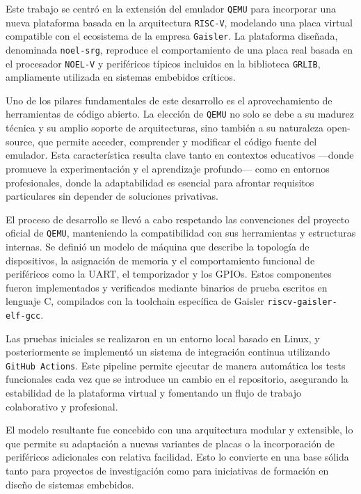 Este trabajo se centró en la extensión del emulador \texttt{QEMU} para incorporar una nueva plataforma basada en la arquitectura \texttt{RISC-V}, modelando una placa virtual compatible con el ecosistema de la empresa \texttt{Gaisler}. La plataforma diseñada, denominada \texttt{noel-srg}, reproduce el comportamiento de una placa real basada en el procesador \texttt{NOEL-V} y periféricos típicos incluidos en la biblioteca \texttt{GRLIB}, ampliamente utilizada en sistemas embebidos críticos.

Uno de los pilares fundamentales de este desarrollo es el aprovechamiento de herramientas de código abierto. La elección de \texttt{QEMU} no solo se debe a su madurez técnica y su amplio soporte de arquitecturas, sino también a su naturaleza open-source, que permite acceder, comprender y modificar el código fuente del emulador. Esta característica resulta clave tanto en contextos educativos —donde promueve la experimentación y el aprendizaje profundo— como en entornos profesionales, donde la adaptabilidad es esencial para afrontar requisitos particulares sin depender de soluciones privativas.

El proceso de desarrollo se llevó a cabo respetando las convenciones del proyecto oficial de \texttt{QEMU}, manteniendo la compatibilidad con sus herramientas y estructuras internas. Se definió un modelo de máquina que describe la topología de dispositivos, la asignación de memoria y el comportamiento funcional de periféricos como la UART, el temporizador y los GPIOs. Estos componentes fueron implementados y verificados mediante binarios de prueba escritos en lenguaje C, compilados con la toolchain específica de Gaisler \texttt{riscv-gaisler-elf-gcc}.

Las pruebas iniciales se realizaron en un entorno local basado en Linux, y posteriormente se implementó un sistema de integración continua utilizando \texttt{GitHub Actions}. Este pipeline permite ejecutar de manera automática los tests funcionales cada vez que se introduce un cambio en el repositorio, asegurando la estabilidad de la plataforma virtual y fomentando un flujo de trabajo colaborativo y profesional.

El modelo resultante fue concebido con una arquitectura modular y extensible, lo que permite su adaptación a nuevas variantes de placas o la incorporación de periféricos adicionales con relativa facilidad. Esto lo convierte en una base sólida tanto para proyectos de investigación como para iniciativas de formación en diseño de sistemas embebidos.

